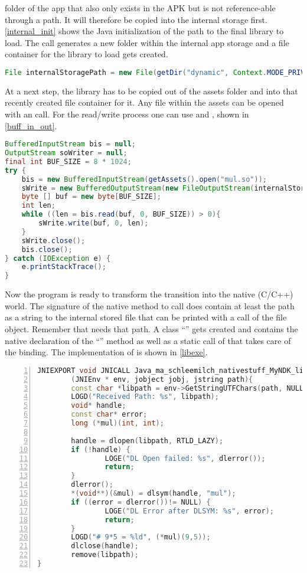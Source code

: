  folder of the app that also only exists in the APK but is not 
reference-able through a path. It will therefore be copied into the internal storage first. \autoref{internal_init} shows the Java initialization of the path to the final library to load. The  call generates a new folder within the internal app storage and a file container for the library to load gets created. 
\begin{lstlisting}[language=Java, caption=Internal Storage Initialization, label=internal_init]
File internalStoragePath = new File(getDir("dynamic", Context.MODE_PRIVATE), "mul.so");
\end{lstlisting}
At a next step, the library has to be copied out of the assets folder and into that 
recently created file container for it. Any file within the assets can be opened with an
 call. For the read/write process one can use
 and , shown in 
\autoref{buff_in_out}.
\begin{lstlisting}[language=Java, caption=Buffered Input/Output, label=buff_in_out]
BufferedInputStream bis = null;
OutputStream soWriter = null;
final int BUF_SIZE = 8 * 1024;
try {
    bis = new BufferedInputStream(getAssets().open("mul.so"));
    sWrite = new BufferedOutputStream(new FileOutputStream(internalStoragePath));
    byte [] buf = new byte[BUF_SIZE];
    int len;
    while ((len = bis.read(buf, 0, BUF_SIZE)) > 0){
        sWrite.write(buf, 0, len);
    }
    sWrite.close();
    bis.close();
} catch (IOException e) {
    e.printStackTrace();
}
\end{lstlisting}
Now the program is ready to transform the transition into the native (C/C++) world.
The signature of the native method to call does contain at least the path as a string to
the internal stored file that can be printed with a  call of the
 file object. Remember that  needs that path.
A class ``'' gets created and contains the native declaration of the
``'' method as well as a static call of 
 that takes care of the binding. 
The implementation of  is shown in \autoref{libexe}. 
\begin{lstlisting}[language=C++, caption=Native libExe(), label=libexe, numbers=left]
JNIEXPORT void JNICALL Java_ma_schleemilch_nativestuff_MyNDK_libExe
        (JNIEnv * env, jobject jobj, jstring path){
        const char *libpath = env->GetStringUTFChars(path, NULL);
        LOGD("Received Path: %s", libpath);
        void* handle;
        const char* error;
        long (*mul)(int, int);

        handle = dlopen(libpath, RTLD_LAZY);
        if (!handle) {
                LOGE("DL Open failed: %s", dlerror());
                return;
        }
        dlerror();
        *(void**)(&mul) = dlsym(handle, "mul");
        if ((error = dlerror())!= NULL) {
                LOGE("DL Error after DLSYM: %s", error);
                return;
        }
        LOGD("# 9*5 = %ld", (*mul)(9,5));
        dlclose(handle);
        remove(libpath);
}
\end{lstlisting}
